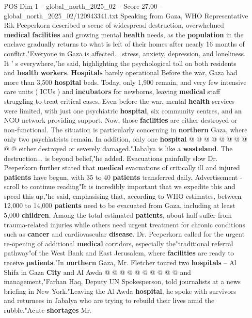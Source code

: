\begin{textsample}{POS Dim 1 – global\_north\_2025\_02 – Score 27.00 – global\_north\_2025\_02/120943341.txt}  \label{ex:f1_pos_436}
Speaking from Gaza, WHO Representative Rik Peeperkorn described a scene of widespread destruction, overwhelmed \textbf{medical} \textbf{facilities} and growing mental \textbf{health} needs, as the \textbf{population} in the enclave gradually returns to what is left of their homes after nearly 16 months of conflict."Everyone in Gaza is affected... stress, anxiety, depression, and loneliness.
It ' s everywhere,"he said, highlighting the psychological toll on both residents and \textbf{health} \textbf{workers}. \textbf{Hospitals} barely operational Before the war, Gaza had more than 3,500 \textbf{hospital} beds.
Today, only 1,900 remain, and very few intensive care units ( ICUs ) and \textbf{incubators} for newborns, leaving \textbf{medical} staff struggling to treat critical cases.
Even before the war, mental \textbf{health} services were limited, with just one psychiatric \textbf{hospital}, six community centres, and an NGO network providing support.
Now, those \textbf{facilities} are either destroyed or non-functional.
The situation is particularly concerning in \textbf{northern} Gaza, where only two psychiatrists remain.
In addition, only one \textbf{hospital} @ @ @ @ @ @ @ @ @ @ either destroyed or severely damaged."Jabalya is like a \textbf{wasteland}.
The destruction... is beyond belief,"he added.
Evacuations painfully slow Dr.
Peeperkorn further stated that \textbf{medical} evacuations of critically ill and injured \textbf{patients} have begun, with 35 to 40 \textbf{patients} transferred daily.
Advertisement - scroll to continue reading"It is incredibly important that we expedite this and speed this up,"he said, emphasising that, according to WHO estimates, between 12,000 to 14,000 \textbf{patients} need to be evacuated from Gaza, including at least 5,000 \textbf{children}.
Among the total estimated \textbf{patients}, about half suffer from trauma-related injuries while others need urgent treatment for chronic conditions such as \textbf{cancer} and cardiovascular \textbf{disease}.
Dr.
Peeperkorn called for the urgent re-opening of additional \textbf{medical} corridors, especially the"traditional referral pathway"of the West Bank and East Jerusalem, where \textbf{facilities} are ready to receive \textbf{patients}."In \textbf{northern} Gaza, Mr.
Fletcher toured two \textbf{hospitals} -- Al Shifa in Gaza \textbf{City} and Al Awda @ @ @ @ @ @ @ @ @ @ and management,"Farhan Haq, Deputy UN Spokesperson, told journalists at a news briefing in New York."Leaving the Al Awda \textbf{hospital}, he spoke with survivors and returnees in Jabalya who are trying to rebuild their lives amid the rubble."Acute \textbf{shortages} Mr.

\end{textsample}
